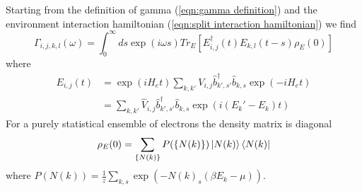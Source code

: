 Starting from the definition of gamma
(\cref{eqn:gamma definition}) and
the environment interaction hamiltonian
(\cref{eqn:split interaction hamiltonian})
we find
\begin{equation}
  \Gamma_{i,j, k,l}(\omega) =
  \int_0^\infty{}{
  ds \exp{(i\omega{}s)}
  Tr_{E}[E^\dagger_{i,j}(t)E_{k,l}(t-s)\rho_E(0)]
  }
\end{equation}
where
\begin{align}
  E_{i, j}(t) & =
  \exp{(iH_e t)}
  \sum_{k,k'} V_{i,j} \hat{b}^\dagger_{k',s'}\hat{b}_{k,s}
  \exp{(-iH_e t)}                           \\
              & = \sum_{k,k'} \hat{V}_{i,j}
  \hat{b}^\dagger_{k',s'}\hat{b}_{k,s} \exp{(i(E_k' - E_k)t)}
\end{align}
For a purely
statistical ensemble of electrons
the density matrix is
diagonal~\cite{sakurai_napolitano_2020}
\begin{equation}
  \rho_E(0) = \sum_{\{N(k)\}}
  P(\{N(k)\})
  \ket{N(k)} \bra{N(k)}
\end{equation}
where \(P(N(k)) =
\frac{1}{z}\sum_{k,s}
\exp{(-{N(k)}_s(\beta E_k - \mu))}\).

